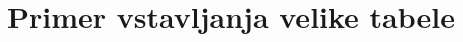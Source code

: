 \documentclass[a4paper, 12pt]{book}
\newcommand{\BibTeX}{{\sc Bib}\TeX}
\begin{document}
\begin{table}
\caption{Primer enostavne tabele.}
\centering
{}
\label{tab:params}
\end{table}

\appendix
\chapter{Primer vstavljanja velike tabele}
\label{ch:dodatek}
\end{document}
